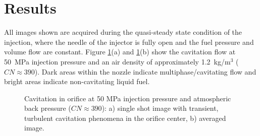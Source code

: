 \documentclass[letterpaper,twocolumn,10pt]{ilass}
\newcommand\CN{\ensuremath{\mathit{CN}}}
\begin{document}
\section*{Results}

All images shown are acquired during the quasi-steady state condition of the injection, where
the needle of the injector is fully open and the fuel pressure and volume flow are
constant. Figure \ref{fig4}(a) and \ref{fig4}(b) show the cavitation flow at 50~MPa injection
pressure and an air density of approximately 1.2~kg/m$^3$ ($\CN \approx 390$).
%
Dark areas within the nozzle indicate multiphase/cavitating flow and bright areas indicate
non-cavitating liquid fuel.
%
\begin{figure}[h]
\begin{center}
\end{center}
\vspace*{-10mm}
\caption{Cavitation in orifice at 50 MPa injection pressure and atmospheric back pressure
         ($\CN \approx 390$): a) single shot image with transient, turbulent cavitation
				 phenomena in the orifice center, b) averaged image.}
\label{fig4} 
\end{figure}
\end{document}

